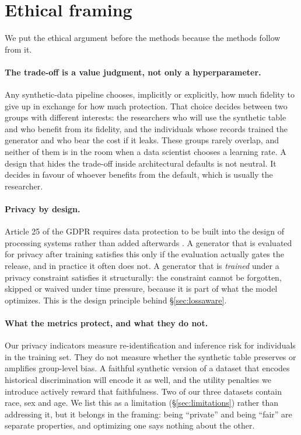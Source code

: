 \documentclass[11pt,a4paper]{article}
\begin{document}
\section{Ethical framing}
\label{sec:ethics}

We put the ethical argument before the methods because the methods follow from
it.

\paragraph{The trade-off is a value judgment, not only a hyperparameter.}
Any synthetic-data pipeline chooses, implicitly or explicitly, how much
fidelity to give up in exchange for how much protection. That choice decides
between two groups with different interests: the researchers who will use the
synthetic table and who benefit from its fidelity, and the individuals whose
records trained the generator and who bear the cost if it leaks. These groups
rarely overlap, and neither of them is in the room when a data scientist
chooses a learning rate. A design that hides the trade-off inside architectural
defaults is not neutral. It decides in favour of whoever benefits from the
default, which is usually the researcher.

\paragraph{Privacy by design.}
Article 25 of the GDPR requires data protection to be built into the design of
processing systems rather than added afterwards
\citep{gdpr2016,cavoukian2009pbd}. A generator that is evaluated for privacy
after training satisfies this only if the evaluation actually gates the
release, and in practice it often does not. A generator that is \emph{trained}
under a privacy constraint satisfies it structurally: the constraint cannot be
forgotten, skipped or waived under time pressure, because it is part of what
the model optimizes. This is the design principle behind
\S\ref{sec:lossaware}.

\paragraph{What the metrics protect, and what they do not.}
Our privacy indicators measure re-identification and inference risk for
individuals in the training set. They do not measure whether the synthetic
table preserves or amplifies group-level bias. A faithful synthetic version of
a dataset that encodes historical discrimination will encode it as well, and
the utility penalties we introduce actively reward that faithfulness. Two of
our three datasets contain race, sex and age. We list this as a limitation
(\S\ref{sec:limitations}) rather than addressing it, but it belongs in the
framing: being ``private'' and being ``fair'' are separate properties, and
optimizing one says nothing about the other.
\end{document}
